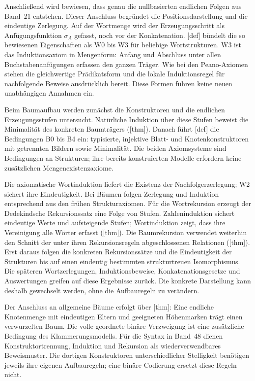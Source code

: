 Anschließend wird bewiesen, dass genau die nullbasierten endlichen Folgen
aus Band~21 entstehen. Dieser Anschluss begründet die Positionsdarstellung
und die eindeutige Zerlegung. Auf der Wortmenge wird der Erzeugungsschritt
als Anfügungsfunktion \(\sigma_A\) gefasst, noch vor der Konkatenation.
[def] bündelt die so bewiesenen
Eigenschaften als W0 bis W3 für beliebige Wortstrukturen. W3 ist das
Induktionsaxiom in Mengenform: Anfang und Abschluss unter allen
Buchstabenanfügungen erfassen den ganzen Träger. Wie bei den
Peano-Axiomen stehen die gleichwertige Prädikatsform und die lokale
Induktionsregel für nachfolgende Beweise ausdrücklich bereit. Diese
Formen führen keine neuen unabhängigen Annahmen ein.

Beim Baumaufbau werden zunächst die Konstruktoren und die endlichen
Erzeugungsstufen untersucht. Natürliche Induktion über diese Stufen
beweist die Minimalität des konkreten Baumträgers
([thm]).
Danach führt [def]
die Bedingungen B0 bis B4 ein: typisierte, injektive Blatt- und
Knotenkonstruktoren mit getrennten Bildern sowie Minimalität.
Die beiden Axiomsysteme sind Bedingungen an Strukturen; ihre bereits
konstruierten Modelle erfordern keine zusätzlichen Mengenexistenzaxiome.

Die axiomatische Wortinduktion liefert die Existenz der
Nachfolgerzerlegung; W2 sichert ihre Eindeutigkeit. Bei Bäumen folgen
Zerlegung und Induktion entsprechend aus den frühen Strukturaxiomen.
Für die Wortrekursion erzeugt der Dedekindsche Rekursionssatz eine Folge
von Stufen. Zahleninduktion sichert eindeutige Werte und aufsteigende
Stufen; Wortinduktion zeigt, dass ihre Vereinigung alle Wörter erfasst
([thm]).
Die Baumrekursion verwendet weiterhin den Schnitt der unter ihren
Rekursionsregeln abgeschlossenen Relationen
([thm]).
Erst daraus folgen die konkreten Rekursionssätze und die Eindeutigkeit
der Strukturen bis auf einen eindeutig bestimmten strukturtreuen
Isomorphismus. Die späteren Wortzerlegungen, Induktionsbeweise,
Konkatenationsgesetze und Auswertungen greifen auf diese Ergebnisse
zurück. Die konkrete Darstellung kann deshalb gewechselt werden,
ohne die Aufbauregeln zu verändern.

Der Anschluss an allgemeine Bäume erfolgt über
[thm]: Eine endliche
Knotenmenge mit eindeutigen Eltern und geeigneten Höhenmarken trägt
einen verwurzelten Baum. Die volle geordnete binäre Verzweigung ist
eine zusätzliche Bedingung des Klammerungsmodells.
Für die Syntax in Band~48 dienen Konstruktortrennung, Induktion und
Rekursion als wiederverwendbares Beweismuster. Die dortigen
Konstruktoren unterschiedlicher Stelligkeit benötigen jeweils ihre
eigenen Aufbauregeln; eine binäre Codierung ersetzt diese Regeln nicht.
\endgroup
